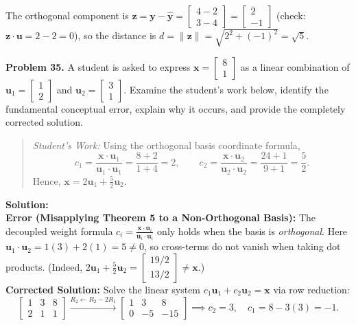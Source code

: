 \documentclass[11pt, letterpaper]{article}
\theoremstyle{definition}
\theoremstyle{remark}
\begin{document}
The orthogonal component is $\mathbf{z} = \mathbf{y} - \hat{\mathbf{y}} = \begin{bmatrix} 4 - 2 \\ 3 - 4 \end{bmatrix} = \begin{bmatrix} 2 \\ -1 \end{bmatrix}$ (check: $\mathbf{z} \cdot \mathbf{u} = 2 - 2 = 0$), so the distance is $d = \|\mathbf{z}\| = \sqrt{2^2 + (-1)^2} = \sqrt{5}$.

\textbf{Problem 35.} A student is asked to express $\mathbf{x} = \begin{bmatrix} 8 \\ 1 \end{bmatrix}$ as a linear combination of $\mathbf{u}_1 = \begin{bmatrix} 1 \\ 2 \end{bmatrix}$ and $\mathbf{u}_2 = \begin{bmatrix} 3 \\ 1 \end{bmatrix}$. Examine the student's work below, identify the fundamental conceptual error, explain why it occurs, and provide the completely corrected solution.
\begin{quote}
\textit{Student's Work:} Using the orthogonal basis coordinate formula,
\[
c_1 = \frac{\mathbf{x} \cdot \mathbf{u}_1}{\mathbf{u}_1 \cdot \mathbf{u}_1} = \frac{8 + 2}{1 + 4} = 2, \qquad
c_2 = \frac{\mathbf{x} \cdot \mathbf{u}_2}{\mathbf{u}_2 \cdot \mathbf{u}_2} = \frac{24 + 1}{9 + 1} = \frac{5}{2}.
\]
Hence, $\mathbf{x} = 2\mathbf{u}_1 + \frac{5}{2}\mathbf{u}_2$.
\end{quote}
\textbf{Solution:} \\
\textbf{Error (Misapplying Theorem 5 to a Non-Orthogonal Basis):} The decoupled weight formula $c_i = \frac{\mathbf{x} \cdot \mathbf{u}_i}{\mathbf{u}_i \cdot \mathbf{u}_i}$ only holds when the basis is \textit{orthogonal}. Here $\mathbf{u}_1 \cdot \mathbf{u}_2 = 1(3) + 2(1) = 5 \neq 0$, so cross-terms do not vanish when taking dot products. (Indeed, $2\mathbf{u}_1 + \frac{5}{2}\mathbf{u}_2 = \begin{bmatrix} 19/2 \\ 13/2 \end{bmatrix} \neq \mathbf{x}$.) \\
\textbf{Corrected Solution:} Solve the linear system $c_1\mathbf{u}_1 + c_2\mathbf{u}_2 = \mathbf{x}$ via row reduction:
\[
\left[\begin{array}{cc|c}
1 & 3 & 8 \\
2 & 1 & 1
\end{array}\right]
\xrightarrow{R_2 \leftarrow R_2 - 2R_1}
\left[\begin{array}{cc|c}
1 & 3 & 8 \\
0 & -5 & -15
\end{array}\right]
\implies c_2 = 3, \quad c_1 = 8 - 3(3) = -1.
\]
\end{document}
